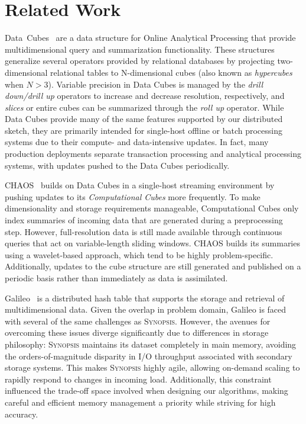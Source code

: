 \section{Related Work}
\label{sec:related}
Data~Cubes~\cite{gray1996data,harinarayan1996implementing,mumick1997maintenance,ho1997range} are a data structure for Online Analytical Processing that provide multidimensional query and summarization functionality. These structures generalize several operators provided by relational databases by projecting two-dimensional relational tables to N-dimensional cubes (also known as \emph{hypercubes} when $N > 3$). Variable precision in Data Cubes is managed by the \emph{drill down/drill up} operators to increase and decrease resolution, respectively, and \emph{slices} or entire cubes can be summarized through the \emph{roll up} operator. While Data Cubes provide many of the same features supported by our distributed sketch, they are primarily intended for single-host offline or batch processing systems due to their compute- and data-intensive updates. In fact, many production deployments separate transaction processing and analytical processing systems, with updates pushed to the Data Cubes periodically. 

CHAOS~\cite{gupta2009chaos} builds on Data Cubes in a single-host streaming environment by pushing updates to its \emph{Computational Cubes} more frequently. To make dimensionality and storage requirements manageable, Computational Cubes only index summaries of incoming data that are generated during a preprocessing step. However, full-resolution data is still made available through continuous queries that act on variable-length sliding windows. CHAOS builds its summaries using a wavelet-based approach, which tend to be highly problem-specific. Additionally, updates to the cube structure are still generated and published on a periodic basis rather than immediately as data is assimilated.

Galileo~\cite{malensek2016analytic,malensek2015fast} is a distributed hash table that supports the storage and retrieval of multidimensional data. Given the overlap in problem domain, Galileo is faced with several of the same challenges as \textsc{Synopsis}. However, the avenues for overcoming these issues diverge significantly due to differences in storage philosophy: \textsc{Synopsis} maintains its dataset completely in main memory, avoiding the orders-of-magnitude disparity in I/O throughput associated with secondary storage systems. This makes \textsc{Synopsis} highly agile, allowing on-demand scaling to rapidly respond to changes in incoming load. Additionally, this constraint influenced the trade-off space involved when designing our algorithms, making careful and efficient memory management a priority while striving for high accuracy.

